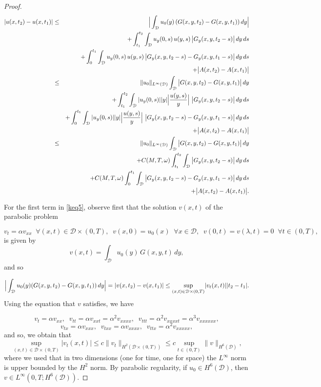 \documentclass[reqno]{amsart}
\numberwithin{equation}{section}
\newcommand{\cd}{\mathcal{D}}
\begin{document}
\begin{proof}
\begingroup
\allowdisplaybreaks
\begin{eqnarray}
|u(x,t_2)-u(x,t_1)| & \leq & \Big{|}\int_{\cd}u_0(y)\,(G(x,y,t_2)-G(x,y,t_1))\, dy\Big{|}\nonumber\\
& & +\int_{t_1}^{t_2}\int_{\mathcal{D}}u_y(0,s)\,u(y,s)\, \big{|}G_{y}(x,y,t_2-s)\big{|}\,dy\,ds\nonumber\\
& & +\int_0^{t_1}\int_{\mathcal{D}}u_y(0,s)\,u(y,s)\, \big{|}G_y(x,y,t_2-s)-G_y(x,y,t_1-s)\big{|}\,dy\,ds\nonumber\\
& & +\big{|}A(x,t_2)-A(x,t_1)\big{|}\nonumber\\
& \leq & \|u_0\|_{L^{\infty}(\cd)}\int_{\cd} \big{|}G(x,y,t_2)-G(x,y,t_1)\big{|}\,dy\nonumber\\
& & +\int_{t_1}^{t_2}\int_{\mathcal{D}}|u_y(0,s)||y|\Big{|}\frac{u(y,s)}{y}\Big{|}\ \big{|}G_y(x,y,t_2-s)\big{|}\,dy\,ds\nonumber\\
& & +\int_0^{t_1}\int_{\mathcal{D}}|u_y(0,s)||y|\Big{|}\frac{u(y,s)}{y}\Big{|}\ \big{|}G_y(x,y,t_2-s)-G_y(x,y,t_{1}-s)\big{|}\,dy\,ds\nonumber\\
& & +\big{|}A(x,t_2)-A(x,t_1)\big{|}\nonumber\\
& \leq & \|u_0\|_{L^{\infty}(\cd)}\int_{\cd} \big{|}G(x,y,t_2)-G(x,y,t_1)\big{|}\,dy\nonumber\\
& &+C(M,T,\omega)\int_{t_1}^{t_2}\int_{\mathcal{D}}\big{|}G_y(x,y,t_2-s)\big{|}\,dy\,ds\nonumber\\
& &+C(M,T,\omega)\int_0^{t_1}\int_{\mathcal{D}}\big{|}G_{y}(x,y,t_2-s)-G_y(x,y,t_1-s)\big{|}\,dy\,ds\nonumber\\
& &+\big{|}A(x,t_2)-A(x,t_1)\big{|}.\label{keq5}
\end{eqnarray}
\endgroup

\noindent
For the first term in \eqref{keq5}, observe first that the solution  $v(x,t)$ of the parabolic problem

$$v_t=\alpha v_{xx}\;\;\forall(x,t)\in\mathcal{D}\times
(0,T),\;\;v(x,0)=u_0(x)\;\;\forall x\in\mathcal{D},\;\;v(0,t)=v(\lambda,t)=0\;\;\forall t\in(0,T),$$
is given by
$$v(x,t) = \int_{\cd}u_0(y)\,G(x,y,t)\,dy,$$
and so 

$$\Big{|}\int_{\cd}u_0(y) (G(x,y,t_2)-G(x,y,t_1))\,
dy\Big{|}=|v(x,t_2)-v(x,t_1)|\leq
\displaystyle{\sup_{(x,t)\in\mathcal{D}\times
(0,T)}}|v_t(x,t)||t_2-t_1|.$$ Using the equation that $v$
satisfies, we have

$$v_t=\alpha v_{xx},\;\;v_{tt}=\alpha
v_{xxt}=\alpha^2v_{xxxx},\;\;v_{ttt}=\alpha^2v_{xxxxt}=\alpha^3v_{xxxxxx},$$
$$v_{tx}=\alpha v_{xxx},\;\;v_{txx}=\alpha v_{xxxx},\;\;v_{ttx}=\alpha^2v_{xxxxx},$$
and so, we obtain that
$$\displaystyle{\sup_{(x,t)\in\mathcal{D}\times
(0,T)}}|v_t(x,t)|\leq c\|v_t\|_{H^2(\mathcal{D}\times (0,T))}\leq
c\displaystyle{\sup_{t\in (0,T)}}\|v\|_{H^6(\mathcal{D})},$$
where we used that in two dimensions (one for time, one for space) the $L^\infty$ norm is upper bounded by the $H^2$ norm. 
By parabolic regularity, if $u_0\in H^6(\mathcal{D})$, then $v\in L^\infty(0,T;H^6(\mathcal{D}))$.


\end{proof}
\end{document}
